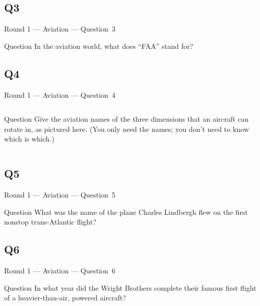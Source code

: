 \documentclass[11pt]{beamer}
\begin{document}
\subsection*{Q3}
\begin{frame}[t]{Round 1 --- Aviation --- \mbox{Question 3}}
    \vspace{-0.5em}
    \begin{block}{Question}
        In the aviation world, what does ``FAA'' stand for?
    \end{block}
\end{frame}
\subsection*{Q4}
\begin{frame}[t]{Round 1 --- Aviation --- \mbox{Question 4}}
    \vspace{-0.5em}
    \begin{columns}[T,totalwidth=\linewidth]
        \begin{column}{0.32\linewidth}
            \begin{block}{Question}
                Give the aviation names of the three dimensions that an aircraft can rotate in, as pictured here. (You only need the names; you don't need to know which is which.)
            \end{block}
        \end{column}
        \begin{column}{0.65\linewidth}
            \begin{center}
                \texttt{[image: \{Images/rollpitchyaw]}.png}
            \end{center}
        \end{column}
    \end{columns}
\end{frame}
\subsection*{Q5}
\begin{frame}[t]{Round 1 --- Aviation --- \mbox{Question 5}}
    \vspace{-0.5em}
    \begin{block}{Question}
        What was the name of the plane Charles Lindbergh flew on the first nonstop trans-Atlantic flight?
    \end{block}
\end{frame}
\subsection*{Q6}
\begin{frame}[t]{Round 1 --- Aviation --- \mbox{Question 6}}
    \vspace{-0.5em}
    \begin{block}{Question}
        In what year did the Wright Brothers complete their famous first flight of a heavier-than-air, powered aircraft?
    \end{block}
\end{frame}
\end{document}
